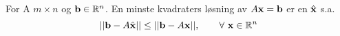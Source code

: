 For A $m\times n$ og $\mathbf{b}\in\mathbb{R}^n$.
En minste kvadraters løsning av $A\mathbf{x}=\mathbf{b}$ er
en $\hat{\mathbf{x}}$ s.a.
$$||\mathbf{b}-A\hat{\mathbf{x}}|| \leq ||\mathbf{b}-A\mathbf{x}||,
  \qquad \forall\ \mathbf{x} \in \mathbb{R}^n$$
